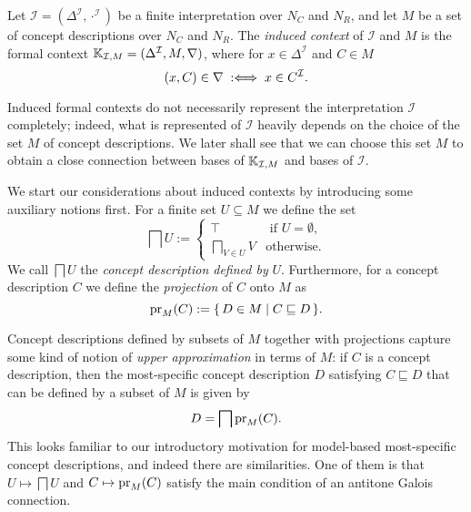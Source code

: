 \begin{Definition}
  \label{def:induced-context}
  Let $\mathcal{I} = (\Delta^{\mathcal{I}}, \cdot^{\mathcal{I}})$ be a finite
  interpretation over $N_C$ and $N_R$, and let $M$ be a set of concept descriptions over
  $N_C$ and $N_R$.  The \emph{induced context} of $\mathcal{I}$ and $M$ is the formal
  context ${\mathbb{K}}_{\mathcal{I}, M} = (\Delta^{\mathcal{I}}, M, \nabla)$, where for $x \in
  \Delta^{\mathcal{I}}$ and $C \in M$
  \begin{equation*}
    (x, C) \in \nabla \;:\Longleftrightarrow\; x \in C^{\mathcal{I}}.
  \end{equation*}  
\end{Definition}

Induced formal contexts do not necessarily represent the interpretation $\mathcal{I}$
completely; indeed, what is represented of $\mathcal{I}$ heavily depends on the choice of
the set $M$ of concept descriptions.  We later shall see that we can choose this set $M$
to obtain a close connection between bases of ${\mathbb{K}}_{\mathcal{I}, M}$ and bases of
$\mathcal{I}$.

We start our considerations about induced contexts by introducing some auxiliary notions
first.  For a finite set $U \subseteq M$ we define the set
\begin{equation*}
  \bigsqcap U :=
  \begin{cases}
    \top & \text{ if } U = \emptyset, \\
    \bigsqcap_{V \in U} V & \text{otherwise}.
  \end{cases}
\end{equation*}
We call $\bigsqcap U$ the \emph{concept description defined by} $U$.  Furthermore, for a
concept description $C$ we define the \emph{projection} of $C$ onto $M$ as
\begin{equation*}
  \operatorname{pr}_M(C) := {\{\, D \in M \mid C \sqsubseteq D \,\}}.
\end{equation*}

Concept descriptions defined by subsets of $M$ together with projections capture some kind
of notion of \emph{upper approximation} in terms of $M$: if $C$ is a concept description,
then the most-specific concept description $D$ satisfying $C \sqsubseteq D$ that can be
defined by a subset of $M$ is given by
\begin{equation*}
  D = \bigsqcap \operatorname{pr}_M(C).
\end{equation*}
This looks familiar to our introductory motivation for model-based most-specific concept
descriptions, and indeed there are similarities.  One of them is that $U \mapsto \bigsqcap
U$ and $C \mapsto \operatorname{pr}_M(C)$ satisfy the main condition of an antitone Galois connection.

